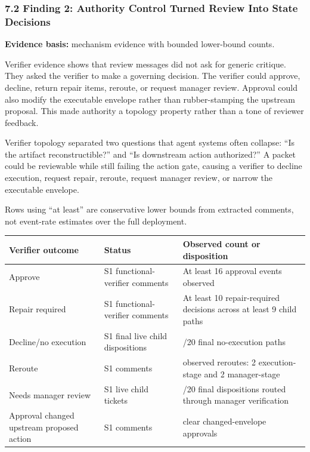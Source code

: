 \documentclass[
]{article}
\newcounter{none} %
\begin{document}
\subsubsection{7.2 Finding 2: Authority Control Turned Review Into State Decisions}\label{finding-2-authority-control-turned-review-into-state-decisions}

\textbf{Evidence basis:} mechanism evidence with bounded lower-bound counts.

Verifier evidence shows that review messages did not ask for generic critique. They asked the verifier to make a governing decision. The verifier could approve, decline, return repair items, reroute, or request manager review. Approval could also modify the executable envelope rather than rubber-stamping the upstream proposal. This made authority a topology property rather than a tone of reviewer feedback.

Verifier topology separated two questions that agent systems often collapse: ``Is the artifact reconstructible?'' and ``Is downstream action authorized?'' A packet could be reviewable while still failing the action gate, causing a verifier to decline execution, request repair, reroute, request manager review, or narrow the executable envelope.

Rows using ``at least'' are conservative lower bounds from extracted comments, not event-rate estimates over the full deployment.

{\def\LTcaptype{none} %
\begin{longtable}[]{@{}
  >{\raggedright\arraybackslash}p{}
  >{\raggedright\arraybackslash}p{}
  >{\raggedright\arraybackslash}p{}@{}}
\toprule\noalign{}
\begin{minipage}[b]{\linewidth}\raggedright
Verifier outcome
\end{minipage} & \begin{minipage}[b]{\linewidth}\raggedright
Status
\end{minipage} & \begin{minipage}[b]{\linewidth}\raggedright
Observed count or disposition
\end{minipage} \\
\midrule\noalign{}
\endhead
\bottomrule\noalign{}
\endlastfoot
Approve & S1 functional-verifier comments & At least 16 approval events observed \\
Repair required & S1 functional-verifier comments & At least 10 repair-required decisions across at least 9 child paths \\
Decline/no execution & S1 final live child dispositions & 6/20 final no-execution paths \\
Reroute & S1 comments & 4 observed reroutes: 2 execution-stage and 2 manager-stage \\
Needs manager review & S1 live child tickets & 20/20 final dispositions routed through manager verification \\
Approval changed upstream proposed action & S1 comments & 3 clear changed-envelope approvals \\
\end{longtable}
}
\end{document}
